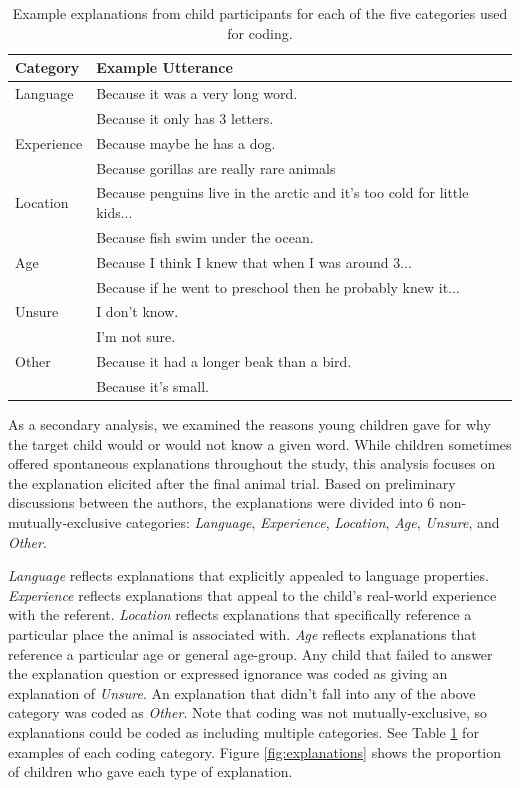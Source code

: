\documentclass[10pt, letterpaper]{article}
\begin{document}
\begin{table}[tb]
\centering
\begin{tabular}{ll}
  \hline
Category & Example Utterance \\ 
  \hline
Language & Because it was a very long word. \\ 
    & Because it only has 3 letters. \\ 
  Experience & Because maybe he has a dog. \\ 
    & Because gorillas are really rare animals \\ 
  Location & Because penguins live in the arctic and it's too cold for little kids... \\ 
    & Because fish swim under the ocean. \\ 
  Age & Because I think I knew that when I was around 3... \\ 
    & Because if he went to preschool then he probably knew it... \\ 
  Unsure & I don't know. \\ 
    & I'm not sure. \\ 
  Other & Because it had a longer beak than a bird. \\ 
    & Because it's small. \\ 
   \hline
\end{tabular}
\caption{Example explanations from child participants for each of the five categories used for coding.} 
\label{tab:explanations_table}
\end{table}

As a secondary analysis, we examined the reasons young children gave for
why the target child would or would not know a given word. While
children sometimes offered spontaneous explanations throughout the
study, this analysis focuses on the explanation elicited after the final
animal trial. Based on preliminary discussions between the authors, the
explanations were divided into 6 non-mutually-exclusive categories:
\emph{Language}, \emph{Experience}, \emph{Location}, \emph{Age},
\emph{Unsure}, and \emph{Other}.

\emph{Language} reflects explanations that explicitly appealed to
language properties. \emph{Experience} reflects explanations that appeal
to the child's real-world experience with the referent. \emph{Location}
reflects explanations that specifically reference a particular place the
animal is associated with. \emph{Age} reflects explanations that
reference a particular age or general age-group. Any child that failed
to answer the explanation question or expressed ignorance was coded as
giving an explanation of \emph{Unsure}. An explanation that didn't fall
into any of the above category was coded as \emph{Other}. Note that
coding was not mutually-exclusive, so explanations could be coded as
including multiple categories. See Table \ref{tab:explanations_table}
for examples of each coding category. Figure \ref{fig:explanations}
shows the proportion of children who gave each type of explanation.
\end{document}
